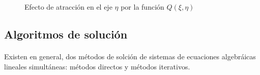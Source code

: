 \documentclass[letterpaper, openright, 12pt]{book}
\begin{document}
				\begin{figure}[htbp!]
					\centering
					\hspace{1cm}
					\caption[Efecto de atracción por función $Q(\xi,\eta)$]{Efecto de atracción en el eje $\eta$ por la función $Q(\xi, \eta)$}
					\label{fig:densidad-eta}
				\end{figure}
			
			\subsection{Algoritmos de solución}
				\paragraph*{}
					Existen en general, dos métodos de solción de sistemas de ecuaciones algebráicas lineales simultáneas: métodos directos y métodos iterativos.
				
\end{document}
